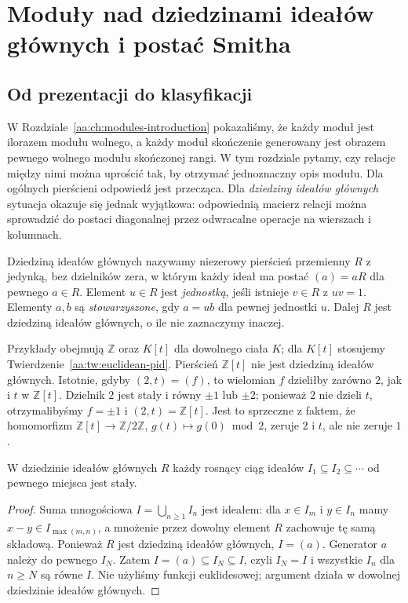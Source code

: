 \chapter[Postać Smitha i klasyfikacja modułów]{Moduły nad dziedzinami ideałów głównych i postać Smitha}
\label{aa:ch:pid-modules-smith}

\providecommand{\atlasref}[2]{#2}

\section{Od prezentacji do klasyfikacji}
W Rozdziale~\ref{aa:ch:modules-introduction} pokazaliśmy, że każdy moduł
jest ilorazem modułu wolnego, a każdy moduł skończenie generowany jest
obrazem pewnego wolnego modułu skończonej rangi. W tym rozdziale pytamy, czy relacje między
nimi można uprościć tak, by otrzymać jednoznaczny opis modułu. Dla
ogólnych pierścieni odpowiedź jest przecząca. Dla \emph{dziedziny ideałów
głównych} sytuacja okazuje się jednak wyjątkowa: odpowiednią macierz
relacji można sprowadzić do postaci diagonalnej przez odwracalne
operacje na wierszach i kolumnach.

\begin{definicja}
\label{aa:def:pid17}
Dziedziną ideałów głównych nazywamy niezerowy pierścień przemienny
$R$ z jedynką, bez dzielników zera, w którym każdy ideał ma postać
$(a)=aR$ dla pewnego $a\in R$. Element $u\in R$ jest \emph{jednostką},
jeśli istnieje $v\in R$ z $uv=1$. Elementy $a,b$ są \emph{stowarzyszone},
gdy $a=ub$ dla pewnej jednostki $u$. Dalej $R$ jest dziedziną ideałów
głównych, o ile nie zaznaczymy inaczej.
\end{definicja}

Przykłady obejmują $\mathbb Z$ oraz $K[t]$ dla dowolnego ciała $K$;
dla $K[t]$ stosujemy Twierdzenie~\ref{aa:tw:euclidean-pid}.
Pierścień $\mathbb Z[t]$ nie jest dziedziną ideałów głównych.
Istotnie, gdyby $(2,t)=(f)$, to wielomian $f$ dzieliłby
zarówno $2$, jak i $t$ w $\mathbb Z[t]$. Dzielnik $2$ jest
stały i równy $\pm1$ lub $\pm2$; ponieważ $2$ nie dzieli
$t$, otrzymalibyśmy $f=\pm1$ i $(2,t)=\mathbb Z[t]$.
Jest to sprzeczne z faktem, że homomorfizm
$\mathbb Z[t]\to\mathbb Z/2\mathbb Z$,
$g(t)\mapsto g(0)\bmod2$, zeruje $2$ i $t$, ale
nie zeruje $1$.

\begin{lemat}
\label{aa:lem:pid-acc17}
W dziedzinie ideałów głównych $R$ każdy rosnący ciąg ideałów
$I_1\subseteq I_2\subseteq\cdots$ od pewnego miejsca jest stały.
\end{lemat}
\begin{proof}
Suma mnogościowa $I=\bigcup_{n\ge1}I_n$ jest ideałem: dla $x\in I_m$
i $y\in I_n$ mamy $x-y\in I_{\max(m,n)}$, a mnożenie przez dowolny
element $R$ zachowuje tę samą składową. Ponieważ $R$ jest dziedziną
ideałów głównych, $I=(a)$. Generator $a$ należy do pewnego $I_N$.
Zatem $I=(a)\subseteq I_N\subseteq I$, czyli $I_N=I$ i wszystkie
$I_n$ dla $n\ge N$ są równe $I$. Nie użyliśmy funkcji euklidesowej;
argument działa w dowolnej dziedzinie ideałów głównych.
\end{proof}

